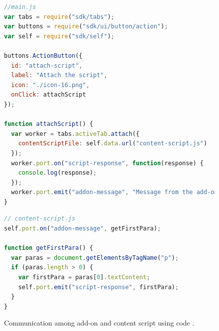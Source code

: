 \begin{figure}[h]
  \centering

\begin{lstlisting}[language=JavaScript] 
//main.js
var tabs = require("sdk/tabs");
var buttons = require("sdk/ui/button/action");
var self = require("sdk/self");

buttons.ActionButton({
  id: "attach-script",
  label: "Attach the script",
  icon: "./icon-16.png",
  onClick: attachScript
});

function attachScript() {
  var worker = tabs.activeTab.attach({
    contentScriptFile: self.data.url("content-script.js")
  });
  worker.port.on("script-response", function(response) {
    console.log(response);
  });
  worker.port.emit("addon-message", "Message from the add-on");
}
\end{lstlisting}
\begin{lstlisting}[language=JavaScript] 
// content-script.js
self.port.on("addon-message", getFirstPara);

function getFirstPara() {
  var paras = document.getElementsByTagName("p");
  if (paras.length > 0) {
    var firstPara = paras[0].textContent;
    self.port.emit("script-response", firstPara);
  }
}
\end{lstlisting}
    \caption[Communication among add-on and content script using code]{Communication among add-on and content script using code \cite{bib1}.}
    \label{fig:communication}
\end{figure}

